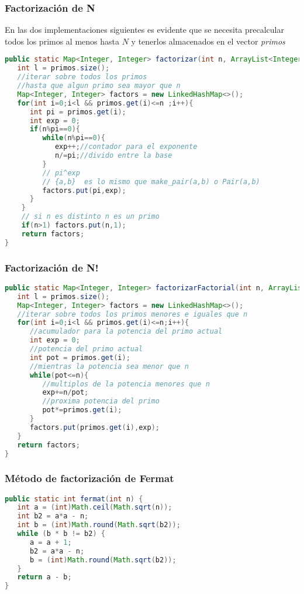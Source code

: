 \subsubsection{Factorización de N}
En las dos implementaciones siguientes es evidente que se necesita precalcular todos los primos al menos hasta $N$ y tenerlos almacenados en el vector \emph{primos}

\begin{lstlisting}[language=Java]
public static Map<Integer, Integer> factorizar(int n, ArrayList<Integer> primos){
   int l = primos.size();
   //iterar sobre todos los primos
   //hasta que algun primo sea mayor que n
   Map<Integer, Integer> factors = new LinkedHashMap<>();
   for(int i=0;i<l && primos.get(i)<=n ;i++){
      int pi = primos.get(i);
      int exp = 0;
      if(n%pi==0){
         while(n%pi==0){
            exp++;//contador para el exponente
            n/=pi;//divido entre la base
         }
         // pi^exp
         // {a,b}  es lo mismo que make_pair(a,b) o Pair(a,b)
         factors.put(pi,exp);
      }
    }
	// si n es distinto n es un primo
	if(n>1) factors.put(n,1);
	return factors;
}
\end{lstlisting}

\subsubsection{Factorización de N!}
\begin{lstlisting}[language=Java]
public static Map<Integer, Integer> factorizarFactorial(int n, ArrayList<Integer> primos){
   int l = primos.size();
   Map<Integer, Integer> factors = new LinkedHashMap<>();
   //iterar sobre todos los primos menores e iguales que n
   for(int i=0;i<l && primos.get(i)<=n;i++){
      //acumulador para la potencia del primo actual
      int exp = 0;
      //potencia del primo actual
      int pot = primos.get(i);
      //mientras la potencia sea menor que n
      while(pot<=n){
         //multiplos de la potencia menores que n
         exp+=n/pot;
         //proxima potencia del primo
         pot*=primos.get(i);
      }
      factors.put(primos.get(i),exp);
   }
   return factors;
}
\end{lstlisting}


\subsubsection{Método de factorización de Fermat}
\begin{lstlisting}[language=Java]
public static int fermat(int n) {
   int a = (int)Math.ceil(Math.sqrt(n));
   int b2 = a*a - n;
   int b = (int)Math.round(Math.sqrt(b2));
   while (b * b != b2) {
      a = a + 1;
      b2 = a*a - n;
      b = (int)Math.round(Math.sqrt(b2));
   }
   return a - b;
}
\end{lstlisting} 


